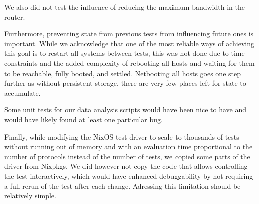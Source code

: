 We also did not test the influence of reducing the maximum bandwidth in the router.

Furthermore, preventing state from previous tests from influencing future ones is important.
While we acknowledge that one of the most reliable ways of achieving this goal is to restart all systems between tests, this was not done due to time constraints and the added complexity of rebooting all hosts and waiting for them to be reachable, fully booted, and settled.
Netbooting all hosts goes one step further as without persistent storage, there are very few places left for state to accumulate.

Some unit tests for our data analysis scripts would have been nice to have and would have likely found at least one particular bug.

Finally, while modifying the NixOS test driver to scale to thousands of tests without running out of memory and with an evaluation time proportional to the number of protocols instead of the number of tests, we copied some parts of the driver from Nixpkgs.
We did however not copy the code that allows controlling the test interactively, which would have enhanced debuggability by not requiring a full rerun of the test after each change.
Adressing this limitation should be relatively simple.


